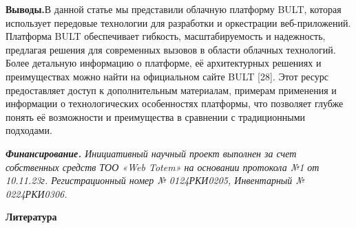 {{\bfseries Выводы.}В данной статье мы представили облачную платформу BULT,
которая использует передовые технологии для разработки и оркестрации
веб-приложений. Платформа BULT обеспечивает гибкость, масштабируемость и
надежность, предлагая решения для современных вызовов в области облачных
технологий. Более детальную информацию о платформе, её архитектурных
решениях и преимуществах можно найти на официальном сайте BULT {[}28{]}.
Этот ресурс предоставляет доступ к дополнительным материалам, примерам
применения и информации о технологических особенностях платформы, что
позволяет глубже понять её возможности и преимущества в сравнении с
традиционными подходами.

\emph{{\bfseries Финансирование.} Инициативный научный проект выполнен за
счет собственных средств ТОО «Web Totem» на основании протокола №1 от
10.11.23г. Регистрационный номер № 0124РКИ0205, Инвентарный №
0224РКИ0306.}

{\bfseries Литература}

}
